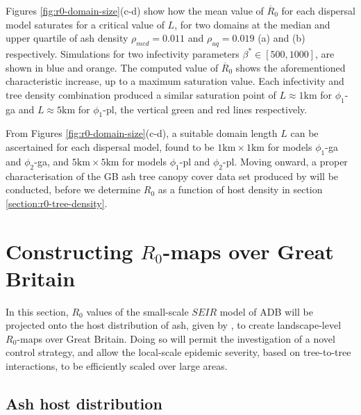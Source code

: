Figures \ref{fig:r0-domain-size}(c-d) show how the mean value of $\overline{R}_0$ for each dispersal model saturates for a critical value of $L$, 
for two domains at the median and upper quartile of ash density $\rho_{med}=0.011$ and $\rho_{uq}=0.019$ (a) and (b) respectively.
Simulations for two infectivity parameters $\beta^* \in [500, 1000]$, are shown in blue and orange.
The computed value of $\overline{R}_0$ shows the aforementioned characteristic increase, up to a maximum saturation value.
Each infectivity and tree density combination produced a similar saturation point of $L \approx 1\mathrm{km}$ for $\phi_1$-ga and $L\approx 5\mathrm{km}$ for $\phi_1$-pl, the vertical green and red lines respectively. 

From Figures \ref{fig:r0-domain-size}(c-d), a suitable domain length $L$ can be ascertained for each dispersal model, 
found to be $\mathrm{1km\times1km}$ for models $\phi_1$-ga and $\phi_2$-ga, and $\mathrm{5km\times5km}$ for models $\phi_1$-pl and $\phi_2$-pl. 
Moving onward, a proper characterisation of the GB ash tree canopy cover data set produced by \cite{hill.data} will be conducted,
before we determine $R_0$ as a function of host density in section \ref{section:r0-tree-density}.

\section{Constructing $R_0$-maps over Great Britain}

\label{sec:r0-map-construct}
In this section, $R_0$ values of the small-scale $SEIR$ model of ADB will be projected onto the host distribution of ash, given by \cite{hill.data}, to create landscape-level $R_0$-maps over Great Britain. 
Doing so will permit the investigation of a novel control strategy, and allow the local-scale epidemic severity, based on tree-to-tree interactions, to be efficiently scaled over large areas.

\subsection{Ash host distribution}


